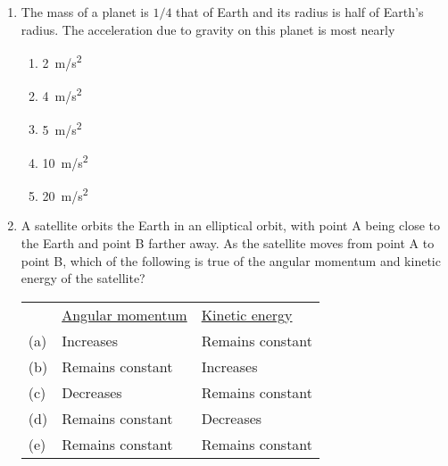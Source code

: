 \documentclass{../../oss-apphys}
\begin{document}
\begin{multicols}{2}
\begin{enumerate}[leftmargin=18pt]
  \item The mass of a planet is $1/4$ that of Earth and its radius is half of
    Earth's radius. The acceleration due to gravity on this planet is most
    nearly
    \begin{enumerate}[noitemsep,topsep=0pt,leftmargin=18pt]
    \item\SI{2 }{m/s^2}
    \item\SI{4 }{m/s^2}
    \item\SI{5 }{m/s^2}
    \item\SI{10}{m/s^2}
    \item\SI{20}{m/s^2}
    \end{enumerate}
  
  \item A satellite orbits the Earth in an elliptical orbit, with point A being
    close to the Earth and point B farther away. As the satellite moves from
    point A to point B, which of the following is true of the angular momentum
    and kinetic energy of the satellite?
    \begin{center}
      \vspace{-.1in}
    \end{center}
  
    \begin{tabular}{lll}
      & \underline{Angular momentum} & \underline{Kinetic energy}\\
      (a) & Increases & Remains constant \\
      (b) & Remains constant & Increases \\
      (c) & Decreases & Remains constant \\
      (d) & Remains constant & Decreases \\
      (e) & Remains constant & Remains constant
    \end{tabular}


\end{enumerate}
\end{multicols}
\end{document}
